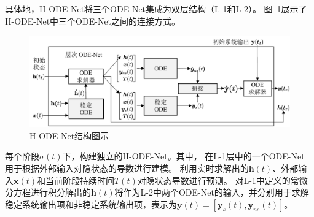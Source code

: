 具体地，H-ODE-Net将三个ODE-Net集成为双层结构（L-1和L-2）。
图~\ref{fig:H_ode}展示了H-ODE-Net中三个ODE-Net之间的连接方式。
\begin{figure}
    \centering
    \includegraphics[width=\linewidth]{figures/chapter4/Hode.pdf}
    \caption{H-ODE-Net结构图示}
    \label{fig:H_ode}
\end{figure}
每个阶段$\sigma(t)$下，构建独立的H-ODE-Net。其中，
在L-1层中的一个ODE-Net
用于根据外部输入对隐状态的导数进行建模。
利用实时求解出的$\boldsymbol h(t)$、外部输入$\boldsymbol x(t)$和当前阶段持续时间$T(t)$对隐状态导数进行预测。
对L-1中定义的常微分方程进行积分解出的$\boldsymbol h(t)$将作为L-2中两个ODE-Net的输入，并分别用于求解稳定系统输出项和非稳定系统输出项，表示为$\boldsymbol y(t)=[\boldsymbol y_s(t), \boldsymbol y_{ns}(t)]$。

